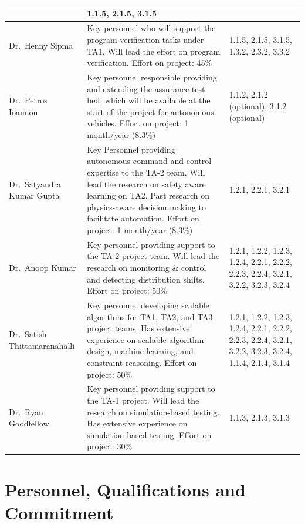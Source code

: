 \documentclass[12pt]{dod-blank}
\begin{document}
\begin{table}[tbhp]
{\begin{tabular}{| m{.75in} | m{3.9in}| m{1.5in}|}
& 
1.1.5, 2.1.5, 3.1.5 \\
\hline
Dr.\ Henny Sipma
& 
Key personnel who will support the program verification tasks under TA1.  Will lead the effort on program verification.   Effort on project:  45\%
& 
1.1.5, 2.1.5, 3.1.5, 1.3.2, 2.3.2, 3.3.2 \\
\hline
Dr.\ Petros Ioannou
& 
Key personnel responsible providing and extending the assurance test bed, which will be available at the start of the project for autonomous vehicles.   Effort on project: 1 month/year (8.3\%)
& 
1.1.2, 2.1.2 (optional), 3.1.2 (optional)
\\
\hline
Dr.\ Satyandra Kumar Gupta
& 
Key Personnel providing autonomous command and control expertise to the TA-2 team.   Will lead the research on safety aware learning on TA2.   Past research on physics-aware decision making to facilitate automation.  Effort on project: 1 month/year (8.3\%)
& 
1.2.1, 2.2.1, 3.2.1 \\
\hline
Dr.\ Anoop Kumar 
& 
Key personnel providing support to the TA 2 project team.  Will lead the research on monitoring \& control and detecting distribution shifts.  Effort on project: 50\%
& 
1.2.1, 1.2.2, 1.2.3, 1.2.4, 2.2.1, 2.2.2, 2.2.3, 2.2.4, 3.2.1, 3.2.2, 3.2.3, 3.2.4\\
\hline
Dr.\ Satish Thittamaranahalli
& 
Key personnel developing scalable algorithms for TA1, TA2, and TA3 project teams.  Has extensive experience on scalable algorithm design, machine learning, and constraint reasoning.  Effort on project: 50\%
& 
1.2.1, 1.2.2, 1.2.3, 1.2.4, 2.2.1, 2.2.2, 2.2.3, 2.2.4, 3.2.1, 3.2.2, 3.2.3, 3.2.4, 1.1.4, 2.1.4, 3.1.4 \\
\hline
Dr.\ Ryan Goodfellow
& 
Key personnel providing support to the TA-1 project. Will lead the research on simulation-based testing.  Has extensive experience on simulation-based testing.  Effort on project:  30\%
& 
1.1.3, 2.1.3, 3.1.3 \\

\cline{1-2}

\hline
\end{tabular}
}
\label{fig:Table_Mgmt}
\end{table}



\newpage
\section{Personnel, Qualifications and Commitment}
\end{document}
